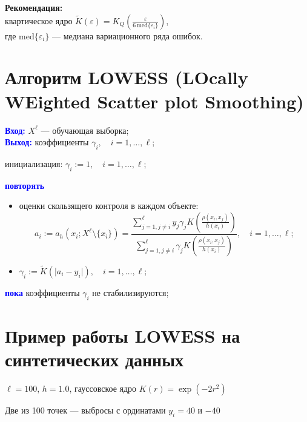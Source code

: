\vspace{1em}
\textbf{Рекомендация:} \\
квартическое ядро \(\tilde{K}(\varepsilon) = K_Q \left( \frac{\varepsilon}{6 \, \mathrm{med}\{\varepsilon_i\}} \right)\), \\
где \(\mathrm{med}\{\varepsilon_i\}\) — медиана вариационного ряда ошибок.

\section*{Алгоритм LOWESS (LOcally WEighted Scatter plot Smoothing)}

\vspace{1em}
\textcolor{blue}{\textbf{Вход:}} \(X^\ell\) — обучающая выборка; \\
\textcolor{blue}{\textbf{Выход:}} коэффициенты \(\gamma_i, \quad i = 1, \ldots, \ell\);

\vspace{1em}
инициализация: \(\gamma_i := 1, \quad i = 1, \ldots, \ell\);

\vspace{1em}
\textcolor{blue}{\textbf{повторять}}
\begin{itemize}
    \item оценки скользящего контроля в каждом объекте:
    \[
    a_i := a_h(x_i; X^\ell \setminus \{x_i\}) = \frac{\sum\limits_{j=1, j \neq i}^{\ell} y_j \gamma_j K\left( \frac{\rho(x_i, x_j)}{h(x_i)} \right)}{\sum\limits_{j=1, j \neq i}^{\ell} \gamma_j K\left( \frac{\rho(x_i, x_j)}{h(x_i)} \right)}, \quad i = 1, \ldots, \ell;
    \]
    \item \(\gamma_i := \tilde{K}(\lvert a_i - y_i \rvert), \quad i = 1, \ldots, \ell;\)
\end{itemize}

\textcolor{blue}{\textbf{пока}} коэффициенты \(\gamma_i\) не стабилизируются;

\section*{Пример работы LOWESS на синтетических данных}

\noindent
\(\ell = 100\), \(h = 1.0\), гауссовское ядро \(K(r) = \exp(-2r^2)\)

\vspace{1em}

Две из 100 точек — выбросы с ординатами \(y_i = 40\) и \(-40\)

\vspace{1em}

